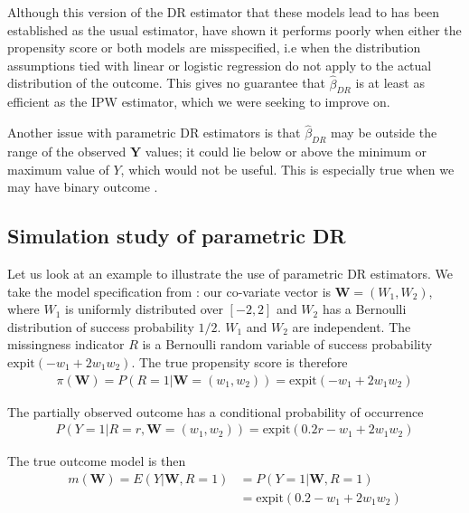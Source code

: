 \documentclass[12pt,twoside]{article}
\newcommand{\expit}{\text{expit}}
\begin{document}
Although this version of the DR estimator that these models lead to has been established as the usual estimator, \cite{kang} have shown it performs poorly when either the propensity score or both models are misspecified, i.e when the distribution assumptions tied with linear or logistic regression do not apply to the actual distribution of the outcome. This gives no guarantee that $\hat\beta_{DR}$ is at least as efficient as the IPW estimator, which we were seeking to improve on.

Another issue with parametric DR estimators is that $\hat\beta_{DR}$ may be outside the range of the observed $\mathbf{Y}$ values; it could lie below or above the minimum or maximum value of $Y$, which would not be useful. This is especially true when we may have binary outcome \citep{vansteelandt}.

\subsection{Simulation study of parametric DR}
\label{para_model}

Let us look at an example to illustrate the use of parametric DR estimators. We take the model specification from \citet{benkeser2017}: our co-variate vector is $\mathbf{W} = (W_1, W_2)$, where $W_1$ is uniformly distributed over $[-2,2]$ and $W_2$ has a Bernoulli distribution of success probability $1/2$. $W_1$ and $W_2$ are independent. The missingness indicator $R$ is a Bernoulli random variable of success probability $\expit(-w_1 + 2w_1w_2)$. The true propensity score is therefore
\begin{align*}
    \pi(\mathbf{W}) = P(R = 1 |\mathbf{W} = (w_1,w_2)) = \expit(-w_1 + 2w_1w_2)
\end{align*}

The partially observed outcome has a conditional probability of occurrence 
\begin{align*}
    P(Y = 1|R = r,\mathbf{W} = (w_1, w_2)) = \expit(0.2r - w_1 + 2w_1w_2)
\end{align*}

The true outcome model is then 
\begin{align*}
    m(\mathbf{W}) = E(Y|\mathbf{W}, R=1) &= P(Y = 1|\mathbf{W}, R= 1) \\
    & = \expit(0.2 - w_1 + 2w_1w_2)
\end{align*}
\end{document}
